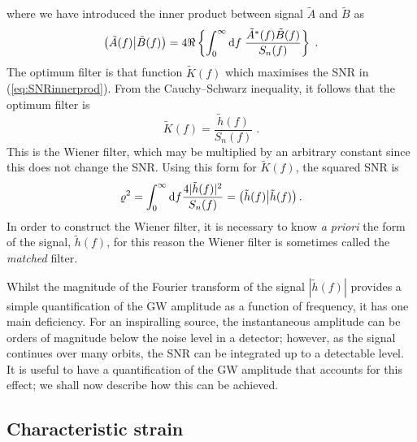 where we have introduced the inner product between signal $\tilde{A}$ and $\tilde{B}$ as \citep{Finn1992}
\begin{equation}\label{eq:snrinnerprod} \left({\tilde{A}(f)}\middle|{\tilde{B}(f)}\right) = 4\Re\left\{\int_{0}^{\infty}\mathrm{d}f\;\frac{\tilde{A}^{*}(f)\tilde{B}(f)}{S_{n}(f)}\right\} \; .\end{equation}
The optimum filter is that function $\tilde{K}(f)$ which maximises the SNR in (\ref{eq:SNRinnerprod}). From the Cauchy--Schwarz inequality, it follows that the optimum filter is
\begin{equation}
\tilde{K}(f)=\frac{\tilde{h}(f)}{S_{n}(f)} \; .
\end{equation}
This is the Wiener filter, which may be multiplied by an arbitrary constant since this does not change the SNR. Using this form for $\tilde{K}(f)$, the squared SNR is
\begin{equation}
\varrho^2 = \int_0^\infty\mathrm{d}f \frac{4| \tilde{h}(f)|^{2}}{S_n(f)} = \left({\tilde{h}(f)}\middle|{\tilde{h}(f)}\right).
\label{eq:traditionalSNR} 
\end{equation}
In order to construct the Wiener filter, it is necessary to know \emph{a priori} the form of the signal, $\tilde{h}(f)$, for this reason the Wiener filter is sometimes called the \emph{matched} filter.

Whilst the magnitude of the Fourier transform of the signal $|\tilde{h}(f)|$ provides a simple quantification of the GW amplitude as a function of frequency, it has one main deficiency. For an inspiralling source, the instantaneous amplitude can be orders of magnitude below the noise level in a detector; however, as the signal continues over many orbits, the SNR can be integrated up to a detectable level. It is useful to have a quantification of the GW amplitude that accounts for this effect; we shall now describe how this can be achieved.

\subsection{Characteristic strain}\label{sec:character-strain}

